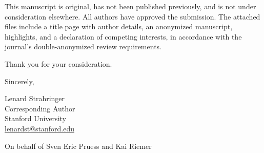 \documentclass[12pt]{article}
\begin{document}
\noindent This manuscript is original, has not been published previously, and is not under consideration elsewhere. All authors have approved the submission. The attached files include a title page with author details, an anonymized manuscript, highlights, and a declaration of competing interests, in accordance with the journal's double-anonymized review requirements.

\vspace{0.5em}

\noindent Thank you for your consideration.

\vspace{1.5em}

\noindent Sincerely,

\vspace{1.5em}

\noindent Lenard Strahringer\\
Corresponding Author\\
Stanford University\\
\href{mailto:lenardst@stanford.edu}{lenardst@stanford.edu}

\noindent On behalf of Sven Eric Pruess and Kai Riemer
\end{document}
